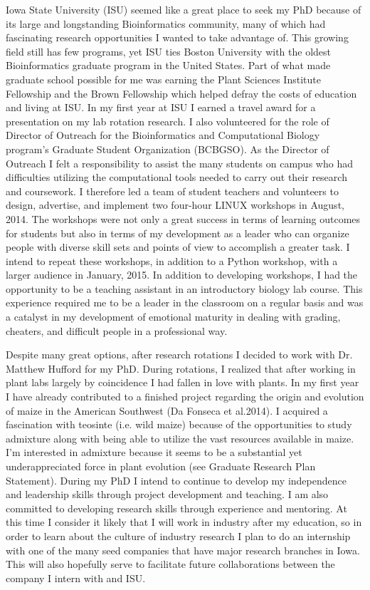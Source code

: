 \documentclass[12pt]{amsart}
\begin{document}
Iowa State University (ISU) seemed like a great place to seek my PhD because of its large and longstanding Bioinformatics community, many of which had fascinating research opportunities I wanted to take advantage of.  
This growing field still has few programs, yet ISU ties Boston University with the oldest Bioinformatics graduate program in the United States.
Part of what made graduate school possible for me was earning the Plant Sciences Institute Fellowship and the Brown Fellowship which helped defray the costs of education and living at ISU.  
In my first year at ISU I earned a travel award for a presentation on my lab rotation research.
I also volunteered for the role of Director of Outreach for the Bioinformatics and Computational Biology program's Graduate Student Organization (BCBGSO).
As the Director of Outreach I felt a responsibility to assist the many students on campus who had difficulties utilizing the computational tools needed to carry out their research and coursework.
I therefore led a team of student teachers and volunteers to design, advertise, and implement two four-hour LINUX workshops in August, 2014.
The workshops were not only a great success in terms of learning outcomes for students but also in terms of my development as a leader who can organize people with diverse skill sets and points of view to accomplish a greater task.
I intend to repeat these workshops, in addition to a Python workshop, with a larger audience in January, 2015.
In addition to developing workshops, I had the opportunity to be a teaching assistant in an introductory biology lab course.
This experience required me to be a leader in the classroom on a regular basis and was a catalyst in my development of emotional maturity in dealing with grading, cheaters, and difficult people in a professional way.

Despite many great options, after research rotations I decided to work with Dr. Matthew Hufford for my PhD.
During rotations, I realized that after working in plant labs largely by coincidence I had fallen in love with plants.
In my first year I have already contributed to a finished project regarding the origin and evolution of maize in the American Southwest (Da Fonseca et al.2014).
I acquired a fascination with teosinte (i.e. wild maize) because of the opportunities to study admixture along with being able to utilize the vast resources available in maize. 
I'm interested in admixture because it seems to be a substantial yet underappreciated force in plant evolution (see Graduate Research Plan Statement).
During my PhD I intend to continue to develop my independence and leadership skills through project development and teaching.  
I am also committed to developing research skills through experience and mentoring.  
At this time I consider it likely that I will work in industry after my education, so in order to learn about the culture of industry research I plan to do an internship with one of the many seed companies that have major research branches in Iowa.
This will also hopefully serve to facilitate future collaborations between the company I intern with and ISU.
\end{document}
